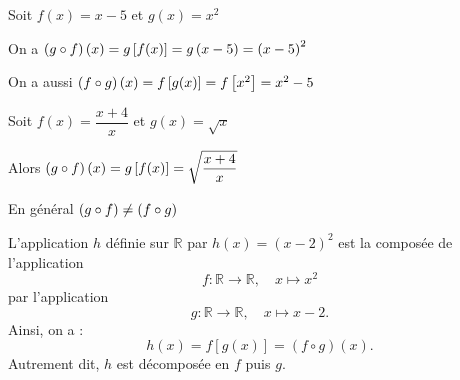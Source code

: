   \begin{example}
 
 Soit $ f(x)= x-5 $  et $ g(x)=x^{2} $
 
 
 On a $ \left(g\circ f\right)(x)=g\left[ f(x) \right]= g\left(x-5\right)=\left(x-5\right)^{2} $
 


  On a aussi $ \left(f\circ g\right)(x)=f\left[ g(x) \right]= f\left[ x^{2} \right]=x^{2}-5 $
 \end{example}

 
 \begin{example}
 
 Soit $ f(x)= \dfrac{x+4}{x} $  et $ g(x)=\sqrt{x} $

Alors \;  $ \left(g\circ f\right)(x)=g\left[ f(x) \right]= \sqrt{\dfrac{x+4}{x}} $
  \end{example}
 
 \begin{remark}
  En général $ \left(g\circ f\right) \neq  \left(f\circ g\right)$
 \end{remark}
 \begin{example}[Reconnaissance]
 
 L'application $h$ définie sur $\mathbb{R}$ par $h(x) = (x - 2)^2$ est la composée de l'application
\[
f : \mathbb{R} \longrightarrow \mathbb{R}, \quad x \longmapsto x^2
\]
par l'application
\[
g : \mathbb{R} \longrightarrow \mathbb{R}, \quad x \longmapsto x - 2.
\]
Ainsi, on a : 
\[
h(x) = f[g(x)] = (f \circ g)(x).
\]
Autrement dit, $h$ est décomposée en $f$ puis $g$.

 \end{example}

